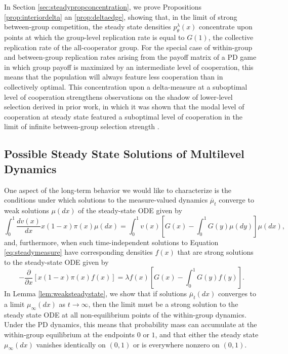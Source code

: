 \documentclass[11pt]{article}
\numberwithin{equation}{section}
\newcommand{\ol}{\overline}
\newcommand{\dsdel}[2]{\displaystyle\frac{\partial #1}{\partial #2}}
\newcommand{\dsddx}[2]{\displaystyle\frac{d #1}{d #2}}
\newcommand{\ov}[1]{\overline{#1}}
\begin{document}
{In Section \ref{sec:steadypropconcentration}, we prove Propositions \ref{prop:interiordelta} an \ref{prop:deltaedge}, showing that, in the limit of strong between-group competition, the steady state densities $p^{\lambda}_{\theta}(x)$ concentrate upon points at which the group-level replication rate is equal to $G(1)$, the collective replication rate of the all-cooperator group. For the special case of within-group and between-group replication rates arising from the payoff matrix of a PD game in which group payoff is maximized by an intermediate level of cooperation, this means that the population will always feature less cooperation than in collectively optimal. This concentration upon a delta-measure at a suboptimal level of cooperation strengthens observations on the shadow of lower-level selection derived in prior work, in which it was shown that the modal level of cooperation at steady state featured a suboptimal level of cooperation in the limit of infinite between-group selection strength \cite{cooney2019replicator,cooney2020analysis,cooney2021pde}.


\subsection{Possible Steady State Solutions of Multilevel Dynamics}
\label{sec:possiblesteady}

One aspect of the long-term behavior we would like to characterize is the conditions under which solutions to the measure-valued dynamics $\ov{\mu}_t$ converge to weak solutions $\mu(dx)$ of the steady-state ODE given by
\begin{equation} \label{eq:steadymeasure}
     \int_0^1 \dsddx{v(x)}{x} x (1-x) \pi(x) \mu(dx) = \int_0^1 v(x) \left[ G(x) - \int_0^1 G(y) \mu(dy) \right] \mu(dx),  
\end{equation}
and, furthermore, when such time-independent solutions to Equation \ref{eq:steadymeasure} have corresponding densities $f(x)$ that are strong solutions  to the steady-state ODE given by
\begin{equation} \label{eq:steadystrong}
 -\dsdel{}{x} \left[ x(1-x) \pi(x) f(x) \right]  = \lambda f(x) \left[ G(x) - \int_0^1 G(y) f(y) \right]. 
\end{equation}
In Lemma \ref{lem:weaksteadystate}, we show that if solutions $\ol{\mu}_t(dx)$ converges to a limit $\mu_{\infty}(dx)$ as $t \to \infty$, then the limit must be a strong solution to the steady state ODE at all non-equilibrium points of the within-group dynamics. Under the PD dynamics, this means that probability mass can accumulate at the within-group equilibrium at the endpoints $0$ or $1$, and that either the steady state $\mu_{\infty}(dx)$ vanishes identically on $(0,1)$ or is everywhere nonzero on $(0,1)$.

}
\end{document}
